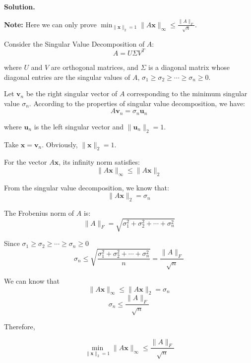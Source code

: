 \documentclass[12pt, a4paper, oneside]{ctexart}
\newenvironment{solution}{\par\noindent\textbf{Solution. }}{\par}
\begin{document}
\begin{solution}

\textbf{Note:} Here we can only prove $ \min_{\|\mathbf{x}\|_2=1}\|A\mathbf{x}\|_\infty \leq \frac{\|A\|_F}{\sqrt{n}}$.

Consider the Singular Value Decomposition of $ A $:
$$
A = U\Sigma V^T
$$

where $ U $ and $ V $ are orthogonal matrices, and $ \Sigma $ is a diagonal matrix whose diagonal entries are the singular values of $ A $, $ \sigma_1 \geq \sigma_2 \geq \cdots \geq \sigma_n \geq 0 $.

Let $ \mathbf{v}_n $ be the right singular vector of $ A $ corresponding to the minimum singular value $ \sigma_n $. According to the properties of singular value decomposition, we have:
$$
A\mathbf{v}_n = \sigma_n \mathbf{u}_n
$$

where $ \mathbf{u}_n $ is the left singular vector and $ \|\mathbf{u}_n\|_2 = 1 $.

Take $ \mathbf{x} = \mathbf{v}_n $. Obviously, $ \|\mathbf{x}\|_2 = 1 $.

For the vector $ A\mathbf{x} $, its infinity norm satisfies:
$$
\|A\mathbf{x}\|_\infty \leq \|A\mathbf{x}\|_2
$$

From the singular value decomposition, we know that:
$$
\|A\mathbf{x}\|_2 = \sigma_n
$$

The Frobenius norm of $ A $ is:
$$
\|A\|_F = \sqrt{\sigma_1^2 + \sigma_2^2 + \cdots + \sigma_n^2}
$$

Since $ \sigma_1 \geq \sigma_2 \geq \cdots \geq \sigma_n \geq 0 $
$$
\sigma_n \leq \sqrt{\frac{\sigma_1^2 + \sigma_2^2 + \cdots + \sigma_n^2}{n}} = \frac{\|A\|_F}{\sqrt{n}}
$$

We can know that
$$
\|A\mathbf{x}\|_\infty \leq \|A\mathbf{x}\|_2 = \sigma_n
$$
$$
\sigma_n \leq \frac{\|A\|_F}{\sqrt{n}}
$$

Therefore,

$$ \min_{\|\mathbf{x}\|_2=1}\|A\mathbf{x}\|_\infty \leq \frac{\|A\|_F}{\sqrt{n}}$$


\end{solution}
\end{document}
